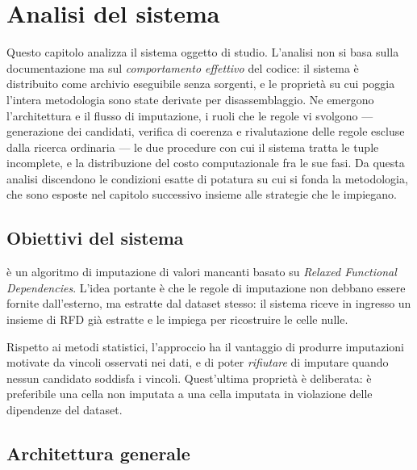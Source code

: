 \chapter{Analisi del sistema \renuver{}}\label{chap:renuver}


\noindent Questo capitolo analizza il sistema oggetto di studio. L'analisi non si basa sulla
documentazione ma sul \emph{comportamento effettivo} del codice: il sistema è distribuito come
archivio eseguibile senza sorgenti, e le proprietà su cui poggia l'intera metodologia sono state
derivate per disassemblaggio. Ne emergono l'architettura e il flusso di imputazione, i ruoli che
le regole vi svolgono --- generazione dei candidati, verifica di coerenza e rivalutazione delle
regole escluse dalla ricerca ordinaria --- le due procedure con cui il sistema tratta le tuple
incomplete, e la distribuzione del costo computazionale fra le sue fasi. Da questa analisi
discendono le condizioni esatte di potatura su cui si fonda la metodologia, che sono esposte nel
capitolo successivo insieme alle strategie che le impiegano.

\section{Obiettivi del sistema}\label{sec:renuver-goals}

\renuver{} \cite{breve2022renuver} è un algoritmo di imputazione di valori mancanti basato su
\emph{Relaxed Functional Dependencies}. L'idea portante è che le regole di imputazione non
debbano essere fornite dall'esterno, ma estratte dal dataset stesso: il sistema riceve in
ingresso un insieme di RFD già estratte e le impiega per ricostruire le celle nulle.

Rispetto ai metodi statistici, l'approccio ha il vantaggio di produrre imputazioni motivate da
vincoli osservati nei dati, e di poter \emph{rifiutare} di imputare quando nessun candidato
soddisfa i vincoli. Quest'ultima proprietà è deliberata: è preferibile una cella non imputata a
una cella imputata in violazione delle dipendenze del dataset.

\section{Architettura generale}\label{sec:architecture}

